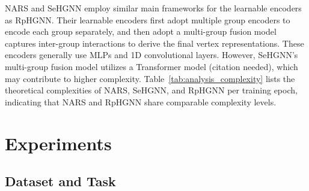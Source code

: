 \documentclass[lettersize,journal]{IEEEtran}
\begin{document}
NARS and SeHGNN employ similar main frameworks for the learnable encoders as RpHGNN.
Their learnable encoders first adopt multiple group encoders to encode each group separately, and then adopt  a multi-group fusion model captures inter-group interactions to derive the final vertex representations.
These encoders generally use MLPs and 1D convolutional layers. 
However, SeHGNN's multi-group fusion model utilizes a Transformer model (citation needed), which may contribute to higher complexity.
Table~\ref{tab:analysis_complexity} lists the theoretical complexities of NARS, SeHGNN, and RpHGNN per training epoch, indicating that NARS and RpHGNN share comparable complexity levels.














\begin{table}[!tp]
\vspace{-2mm}
\centering
\caption{
Theoretical complexity of NARS, SeHGNN, and RpHGNN in every  training epoch.
 is the number of target vertices.
For simplicity, we use the same  as the dimensionality of input features and hidden representations of MLPs.
For NARS,  is the number of sampled relation subsets.
For SeHGNN,  is the number of relations (meta-path schemas) used.
For RpHGNN,  is the number of relations that end with the target vertex type.
}
\label{tab:analysis_complexity}
\end{table}



\section{Experiments}




\subsection{Dataset and Task}
\end{document}
